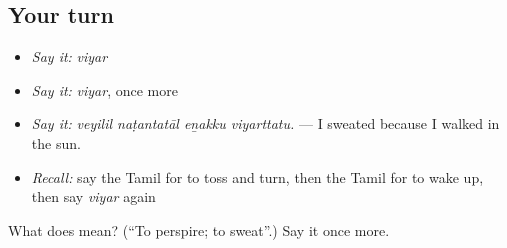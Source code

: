 \subsection*{Your turn}
\begin{itemize}
\raggedright
  \item \emph{Say it:} \emph{viyar}
  \item \emph{Say it:} \emph{viyar}, once more
  \item \emph{Say it:} \emph{veyilil naṭantatāl eṉakku viyarttatu.} — I sweated because I walked in the sun.
  \item \emph{Recall:} say the Tamil for to toss and turn, then the Tamil for to wake up, then say \emph{viyar} again
\end{itemize}

\begin{tcolorbox}[breakable,colback=teal!4,colframe=teal!35!black,title={Before you move on}]
What does  mean? (\textquotedblleft{}To perspire; to sweat\textquotedblright{}.) Say it once more.
\end{tcolorbox}
